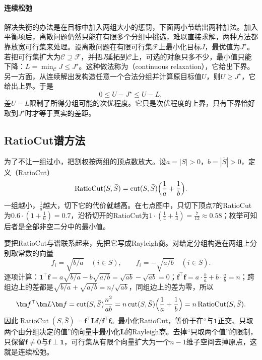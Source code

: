\paragraph{连续松弛}
解决失衡的办法是在目标中加入两组大小的惩罚，下面两小节给出两种加法。加入平衡项后，离散问题仍然只能在有限多个分组中挑选，难以直接求解，两种方法都靠放宽可行集来处理。设离散问题在有限可行集$\mathcal F$上最小化目标$J$，最优值为$J^\star$。若把可行集扩大为$\mathcal C\supseteq\mathcal F$，并把$J$延拓到$\mathcal C$上，可选的对象只多不少，最小值只能下降：$L=\min_{\mathcal C}J\leq J^\star$。这种做法称为（continuous relaxation），它给出下界。另一方面，从连续解出发构造任意一个合法分组并计算原目标值$U$，则$U\geq J^\star$，它给出上界。于是
\[
 0\leq U-J^\star\leq U-L ,
\]
差$U-L$限制了所得分组可能的次优程度。它只是次优程度的上界，只有下界恰好取到$J^\star$时才等于真实的差距。

\subsection{RatioCut谱方法}
\label{sec:graph-spec-ratio-cut}

为了不让一组过小，把割权按两组的顶点数放大。设$a=|S|>0$，$b=|\bar S|>0$，定义（RatioCut）
\begin{equation}
 \operatorname{RatioCut}(S,\bar S)=\operatorname{cut}(S,\bar S)\Bigl(\frac1a+\frac1b\Bigr).
 \label{eq:graph-spec-ratio-cut}
\end{equation}
一组越小，$\frac1a$越大，切下它的代价就越高。在七点图中，只切下顶点$7$的RatioCut为$0.6\cdot(1+\tfrac16)=0.7$，沿桥切开的RatioCut为$1\cdot(\tfrac14+\tfrac13)=\tfrac7{12}\approx0.58$；枚举可知后者是全部非空二分中的最小值。

要把RatioCut与谱联系起来，先把它写成Rayleigh商。对给定分组构造在两组上分别取常数的向量
\begin{equation}
 f_i=\sqrt{b/a}\quad(i\in S),\qquad f_i=-\sqrt{a/b}\quad(i\in\bar S).
 \label{eq:graph-spec-ratio-cut-vector}
\end{equation}
逐项计算：$\bm1^{\top}\bm f=a\sqrt{b/a}-b\sqrt{a/b}=\sqrt{ab}-\sqrt{ab}=0$；$\bm f^{\top}\bm f=a\cdot\tfrac ba+b\cdot\tfrac ab=n$；跨组边上的差都是$\sqrt{b/a}+\sqrt{a/b}=n/\sqrt{ab}$，同组边上的差为零，所以
\[
 \bm f^{\top}\bm L\bm f=\operatorname{cut}(S,\bar S)\frac{n^2}{ab}=n\operatorname{cut}(S,\bar S)\Bigl(\frac1a+\frac1b\Bigr)=n\operatorname{RatioCut}(S,\bar S).
\]
因此$\operatorname{RatioCut}(S,\bar S)=\bm f^{\top}\bm L\bm f/\bm f^{\top}\bm f$。最小化RatioCut，等价于在“与$\bm1$正交、只取两个由分组决定的值”的向量中最小化$\bm L$的Rayleigh商。去掉“只取两个值”的限制，只保留$\bm f\neq\bm0$与$\bm f\perp\bm1$，可行集从有限个向量扩大为一个$n-1$维子空间去掉原点，这就是连续松弛。

